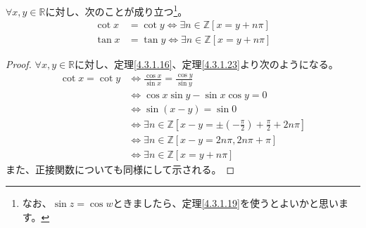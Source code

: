 \documentclass[dvipdfmx]{jsarticle}
\begin{document}
\begin{thm}\label{4.3.1.35}
$\forall x,y \in \mathbb{R}$に対し、次のことが成り立つ\footnote{なお、$\sin z = \cos w$ときましたら、定理\ref{4.3.1.19}を使うとよいかと思います。}。
\begin{align*}
\cot x &= \cot y \Leftrightarrow \exists n \in \mathbb{Z}[ x = y + n\pi]\\
\tan x &= \tan y \Leftrightarrow \exists n \in \mathbb{Z}[ x = y + n\pi]
\end{align*}
\end{thm}
\begin{proof} $\forall x,y \in \mathbb{R}$に対し、定理\ref{4.3.1.16}、定理\ref{4.3.1.23}より次のようになる。
\begin{align*}
\cot x = \cot y &\Leftrightarrow \frac{\cos x}{\sin x} = \frac{\cos y}{\sin y}\\
&\Leftrightarrow \cos x\sin y - \sin x\cos y = 0\\
&\Leftrightarrow \sin(x - y) = \sin 0\\
&\Leftrightarrow \exists n \in \mathbb{Z}\left[ x - y = \pm \left( - \frac{\pi}{2} \right) + \frac{\pi}{2} + 2n\pi \right]\\
&\Leftrightarrow \exists n \in \mathbb{Z}[ x - y = 2n\pi,2n\pi + \pi]\\
&\Leftrightarrow \exists n \in \mathbb{Z}[ x = y + n\pi]
\end{align*}
また、正接関数についても同様にして示される。
\end{proof}
\end{document}
